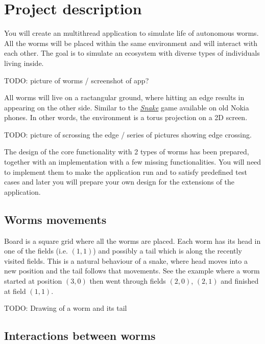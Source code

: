 \documentclass{article}
\begin{document}
\newcommand{\todo}[1]{\vspace{.5cm} TODO: #1 \vspace{.5cm}}

\section{Project description}

You will create an multithread application to simulate life of autonomous worms.
All the worms will be placed within the same environment and will interact
with each other. The goal is to simulate an ecosystem with diverse types
of individuals living inside.

\todo{picture of worms / screenshot of app?}

All worms will live on a ractangular ground, where hitting an edge results
in appearing on the other side. Similar to the
\href{https://elgoog.im/snake/}{\textit{Snake}} game available on old Nokia
phones. In other words, the environment is a torus projection on a 2D
screen.

\todo{picture of scrossing the edge / series of pictures showing edge crossing.}

The design of the core functionality with 2 types of worms has been prepared,
together with an implementation with a few missing functionalities. You will
need to implement them to make the application run and to satisfy predefined
test cases and later you will prepare your own design for the extensions
of the application.

\subsection{Worms movements}

Board is a square grid where all the worms are placed. Each worm has its
head in one of the fields (i.e. $(1,1)$) and possibly a tail which is along
the recently visited fields. This is a natural behaviour of a snake, where
head moves into a new position and the tail follows that movements.
See the example where a worm started at position $(3,0)$ then went through
fields $(2,0)$, $(2,1)$ and finished at field $(1,1)$.

\todo{Drawing of a worm and its tail}

\subsection{Interactions between worms}
\end{document}
